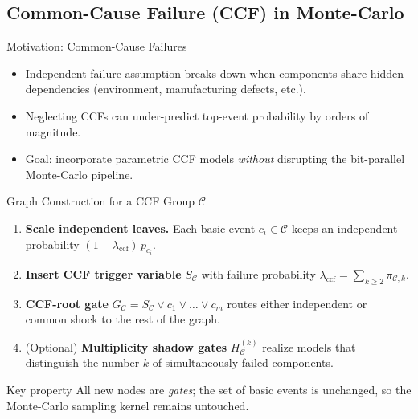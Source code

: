 \subsection{Common-Cause Failure (CCF) in Monte-Carlo}

\begin{frame}{Motivation: Common-Cause Failures}
  \begin{itemize}
    \item Independent failure assumption breaks down when components share hidden dependencies (environment, manufacturing defects, etc.).
    \item Neglecting CCFs can under-predict top-event probability by orders of magnitude.
    \item Goal: incorporate parametric CCF models \emph{without} disrupting the bit-parallel Monte-Carlo pipeline.
  \end{itemize}
  \vspace{4pt}
\end{frame}

\begin{frame}{Graph Construction for a CCF Group $\mathcal C$}
  \footnotesize
  \begin{enumerate}
    \item \textbf{Scale independent leaves.}  Each basic event $c_i\in\mathcal C$ keeps an independent probability $(1-\lambda_{\text{ccf}})\,p_{c_i}$.   
    \item \textbf{Insert CCF trigger variable} $S_{\mathcal C}$ with failure probability $\lambda_{\text{ccf}} = \sum_{k\ge2} \pi_{\mathcal C,k}$.  
    \item \textbf{CCF-root gate} $G_{\mathcal C}= S_{\mathcal C}\lor c_1\lor\dots\lor c_m$ routes either independent or common shock to the rest of the graph.
    \item (Optional) \textbf{Multiplicity shadow gates} $H^{(k)}_{\mathcal C}$ realize models that distinguish the number $k$ of simultaneously failed components.
  \end{enumerate}
  \vspace{2pt}
  \begin{block}{Key property}
    All new nodes are \emph{gates}; the set of basic events is unchanged, so the Monte-Carlo sampling kernel remains untouched.
  \end{block}
\end{frame}

